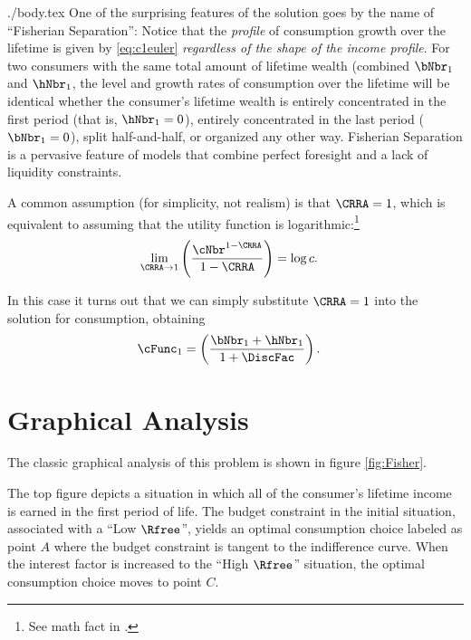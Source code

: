 \documentclass{handout}
\begin{document}
\begin{verbatimwrite}{./body.tex}
  One of the surprising features of the solution goes by the name of ``Fisherian Separation'':  Notice that the \textit{profile} of consumption growth over the lifetime is given by \eqref{eq:c1euler} \textit{regardless of the shape of the income profile}.  For two consumers with the same total amount of lifetime wealth (combined $\bNbr_{1}$ and $\hNbr_{1}$, the level and growth rates of consumption over the lifetime will be identical whether the consumer's lifetime wealth is entirely concentrated in the first period (that is, $\hNbr_{1}=0$), entirely concentrated in the last period ($\bNbr_{1}=0$), split half-and-half, or organized any other way. Fisherian Separation is a pervasive feature of models that combine perfect foresight and a lack of liquidity constraints.

  A common assumption (for simplicity, not realism) is that $\CRRA=1$, which
  is equivalent to assuming that the utility function is logarithmic:\footnote{See
    math fact \CRRALim in \MathFactsList.}
  \begin{equation}\begin{gathered}\begin{aligned}
        \lim_{\CRRA \rightarrow 1} \left(\frac{\cNbr^{1-\CRRA}}{1-\CRRA}\right) & =  \log c.
      \end{aligned}\end{gathered}\end{equation}

  In this case it turns out that we can simply substitute $\CRRA=1$ into the
  solution for consumption, obtaining 
  \begin{equation}\begin{gathered}\begin{aligned}
        \cFunc_{1} & =  \left(\frac{\bNbr_{1}+\hNbr_{1}}{1+\DiscFac}\right).
      \end{aligned}\end{gathered}\end{equation}


  \section{Graphical Analysis}

  The classic graphical analysis of this problem is shown in figure \ref{fig:Fisher}.

  The top figure depicts a situation in which all of the consumer's lifetime income is earned in the first period of life.  The budget constraint in the initial situation, associated with a ``Low $\Rfree$'', yields an optimal consumption choice labeled as point $A$ where the budget constraint is tangent to the indifference curve.  When the interest factor is increased to the ``High $\Rfree$'' situation, the optimal consumption choice moves to point $C$.


\end{verbatimwrite}
\end{document}
